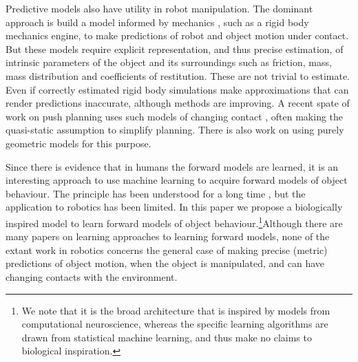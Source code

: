 Predictive models also have utility in robot manipulation. The dominant approach is build a model informed by mechanics \citep{mason_manipulator_1982,lynch_mechanics_1992,peshkin_motion_1988,cappelleri_designing_2006,mason_mechanics_2001,flickinger2015}, such as a rigid body mechanics engine, to make predictions of robot and object motion under contact. But these models require explicit representation, and thus precise estimation, of intrinsic parameters of the object and its surroundings such as friction, mass, mass distribution and coefficients of restitution. These are not trivial to estimate. Even if correctly estimated rigid body simulations make approximations that can render predictions inaccurate, although methods are improving. A recent spate of work on push planning uses such models of changing contact \citep{Dogar_2010,zitoetal-iros12,Cosgun2011}, often making the quasi-static assumption to simplify planning. There is also work on using purely geometric models \citep{stillman08ijrr} for this purpose.

Since there is evidence that in humans the forward models are learned, it is an interesting approach to use machine learning to acquire forward models of object behaviour. The principle has been understood for a long time \citep{JordanJacobs90,JordanRumelhart92}, but the application to robotics has been limited. In this paper we propose a biologically inspired model to learn forward models of object behaviour.\footnote{We note that it is the broad architecture that is inspired by models from computational neuroscience, whereas the specific learning algorithms are drawn from statistical machine learning, and thus make no claims to biological inspiration.}Although there are many papers on learning approaches to learning forward models, none of the extant work in robotics concerns the general case of making precise (metric) predictions of object motion, when the object is manipulated, and can have changing contacts with the environment.